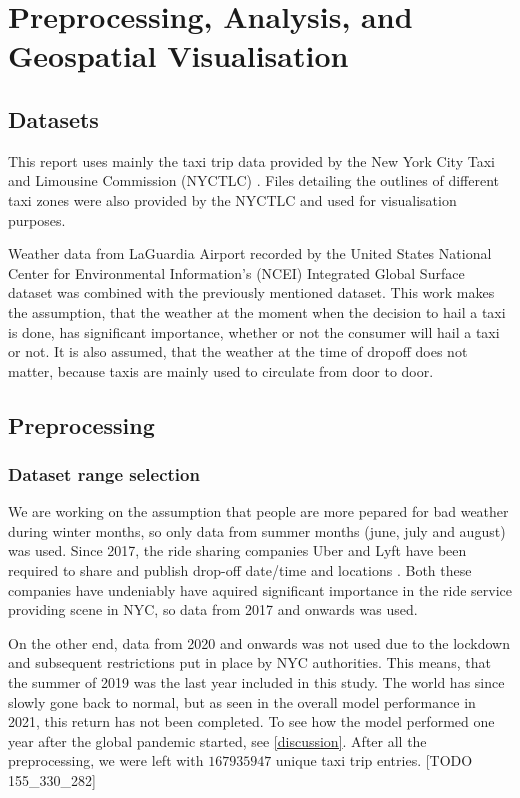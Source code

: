 \documentclass[11pt]{article}
\begin{document}
\section{Preprocessing, Analysis, and Geospatial Visualisation}

\subsection{Datasets}
This report uses mainly the taxi trip data provided by the New York City Taxi and Limousine Commission (NYCTLC) \cite{nyctlcData}. Files detailing the outlines of different taxi zones were also provided by the NYCTLC and used for visualisation purposes.

Weather data from LaGuardia Airport recorded by the United States National Center for Environmental Information's (NCEI) Integrated Global Surface dataset \cite{weatherData} was combined with the previously mentioned dataset. This work makes the assumption, that the weather at the moment when the decision to hail a taxi is done, has significant importance, whether or not the consumer will hail a taxi or not. It is also assumed, that the weather at the time of dropoff does not matter, because taxis are mainly used to circulate from door to door.

\subsection{Preprocessing}

\subsubsection{Dataset range selection}

We are working on the assumption that people are more pepared for bad weather during winter months, so only data from summer months (june, july and august) was used. Since 2017, the ride sharing companies Uber and Lyft have been required to share and publish drop-off date/time and locations \cite{tripUserGuide}. Both these companies have undeniably have aquired significant importance in the ride service providing scene in NYC, so data from 2017 and onwards was used. 

On the other end, data from 2020 and onwards was not used due to the lockdown and subsequent restrictions put in place by NYC authorities. This means, that the summer of 2019 was the last year included in this study. The world has since slowly gone back to normal, but as seen in the overall model performance in 2021, this return has not been completed. To see how the model performed one year after the global pandemic started, see \autoref{discussion}. After all the preprocessing, we were left with $167935947$ unique taxi trip entries. [TODO 155\_330\_282]
\end{document}
